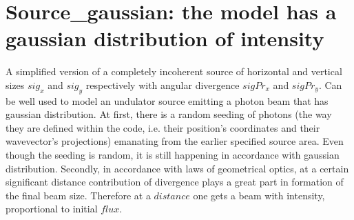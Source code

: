 \section{Source\_gaussian: the model has a gaussian distribution of intensity}
\label{source-gaussian}

A simplified version of a completely incoherent source of horizontal and vertical sizes $sig_x$ and $sig_y$ respectively with angular divergence $sigPr_x$ and $sigPr_y$. Can be well used to model an undulator source emitting a photon beam that has gaussian distribution.
At first, there is a random seeding of photons (the way they are defined within the code, i.e. their position's coordinates and their wavevector's projections) emanating from the earlier specified source area. Even though the seeding is random, it is still happening in accordance with gaussian distribution. 
Secondly, in accordance with laws of geometrical optics, at a certain significant distance contribution of divergence plays a great part in formation of the final beam size.
Therefore at a $distance$ one gets a beam with intensity, proportional to initial $flux$. 
